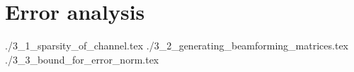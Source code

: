 \chapter {Error analysis}

 {./3_1_sparsity_of_channel.tex}
 {./3_2_generating_beamforming_matrices.tex}
 {./3_3_bound_for_error_norm.tex}
